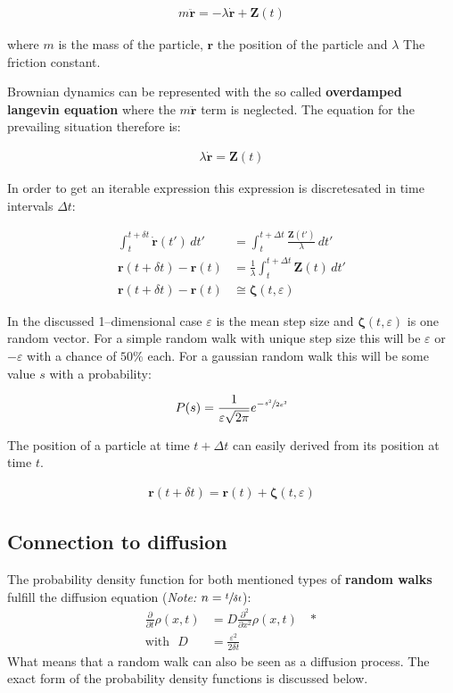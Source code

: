 \documentclass[a4paper, parskip=half]{scrartcl}
\newcommand{\effect}[1]{%
	\textbf{#1}%
}
\newcommand{\myEqLabel}[1]{\label{eq:#1}}
\newcommand{\myEqAnnex}[1]{\;\;\;\ast \myEqLabel{#1}}
\begin{document}
\begin{align}
m \ddot{\mathbf{r}} = -\lambda\dot{\mathbf{r}} + \mathbf{Z}(t)
\end{align}

where $m$ is the mass of the particle, $\mathbf{r}$ the position of the particle and $\lambda$ The friction constant.

Brownian dynamics can be represented with the so called \effect{overdamped langevin equation} where the $m \ddot{\mathbf{r}}$ term is neglected. The equation for the prevailing situation therefore is:

\begin{align}
\lambda\dot{\mathbf{r}} = \mathbf{Z}(t)
\end{align}

In order to get an iterable expression this expression is discretesated in time intervals $\Delta t$:

\begin{align}
\int_t^{t+ \delta t} \dot{\mathbf{r}}(t')\, dt' &= \int_t^{t+ \Delta t} \frac{\mathbf{Z}(t')}{\lambda}\, dt' \\
\mathbf{r}(t + \delta t) - \mathbf{r}(t) &= \frac{1}{\lambda} \int_t^{t+ \Delta t} \mathbf{Z}(t)\, dt'\\
\mathbf{r}(t + \delta t) - \mathbf{r}(t) &\cong \boldsymbol{\zeta}(t, \varepsilon)
\end{align}

In the discussed 1--dimensional case $\varepsilon$ is the mean step size and $\boldsymbol{\zeta}(t, \varepsilon)$ is one random vector. For a simple random walk with unique step size this will be $\varepsilon$ or $-\varepsilon$ with a chance of $50\%$ each. For a gaussian random walk this will be some value $s$ with a probability:

\begin{align}
P(s) = \frac{1}{\varepsilon \sqrt{2\pi}} e^{-\sfrac{s^2}{2\varepsilon^2}}
\end{align} 

The position of a particle at time $t + \Delta t$ can easily derived from its position at time $t$.

\begin{align}
\mathbf{r}(t + \delta t) = \mathbf{r}(t) + \boldsymbol{\zeta}(t, \varepsilon)
\end{align}

\subsection{Connection to diffusion}
The probability density function for both mentioned types of \effect{random walks} fulfill the diffusion equation (\textit{Note: }$n = \sfrac{t}{\delta t}$):
\begin{align}
\frac{\partial}{\partial t} \rho(x,t) &= D \frac{\partial^2}{\partial x^2 } \rho(x,t) \myEqAnnex{diffusion_PDE} \\
\mathrm{with} \, \, \,\, D &= \frac{\varepsilon^2}{2 \delta t} \myEqLabel{def:D}
\end{align}
What means that a random walk can also be seen as a diffusion process. The exact form of the probability density functions is discussed below.
\end{document}
